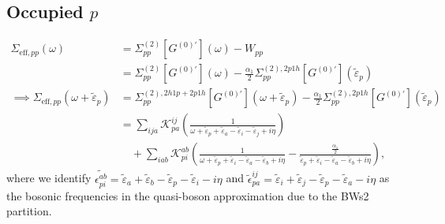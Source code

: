 \subsection{Occupied $p$}
\begin{align}
\Sigma_{\mathrm{eff},pp}(\omega) &=
\Sigma_{pp}^{(2)}\!\left[ G^{(0)'} \right](\omega)
-  W_{pp} \\
&=
\Sigma_{pp}^{(2)}\!\left[ G^{(0)'} \right](\omega)
- \frac{\alpha_1}{2} \Sigma_{pp}^{(2),2p1h}\!\left[ G^{(0)'} \right](\tilde{\varepsilon}_p)\\
\implies \Sigma_{\mathrm{eff},pp}(\omega + \tilde{\varepsilon}_p) &=
\Sigma_{pp}^{(2),2h1p+2p1h}\!\left[ G^{(0)'} \right](\omega + \tilde{\varepsilon}_p)
- \frac{\alpha_1}{2} \Sigma_{pp}^{(2),2p1h}\!\left[ G^{(0)'} \right](\tilde{\varepsilon}_p)\\
&= \sum_{ija} \mathcal{K}_{pa}^{ij} \left( \frac{1}{\omega + \tilde{\varepsilon}_p+ \tilde{\varepsilon}_a  - \tilde{\varepsilon}_i - \tilde{\varepsilon}_j +i\eta}\right)\\
 &\quad + \sum_{iab} \mathcal{K}_{pi}^{ab} \left( \frac{1}{\omega + \tilde{\varepsilon}_p+ \tilde{\varepsilon}_i  - \tilde{\varepsilon}_a - \tilde{\varepsilon}_b +i\eta} - \frac{\frac{\alpha_1}{2}}{\tilde{\varepsilon}_p+ \tilde{\varepsilon}_i  - \tilde{\varepsilon}_a - \tilde{\varepsilon}_b +i\eta} \right),
\end{align}
where we identify $\tilde{\epsilon_{pi}^{ab}} = \tilde{\varepsilon}_a + \tilde{\varepsilon}_b - \tilde{\varepsilon}_p - \tilde{\varepsilon}_i-i\eta$ and $\tilde{\epsilon}_{pa}^{ij} = \tilde{\varepsilon}_i + \tilde{\varepsilon}_j - \tilde{\varepsilon}_p - \tilde{\varepsilon}_a - i\eta$
as the bosonic frequencies in the quasi-boson approximation due to the BWs2 partition.
